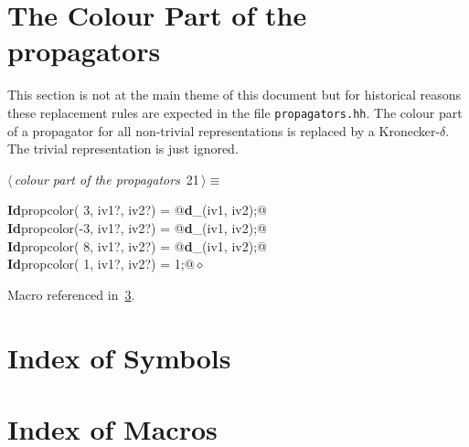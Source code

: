 \documentclass[a4paper,12pt]{amsart}
\renewcommand{\NWtarget}[2]{\hypertarget{#1}{#2}}
\renewcommand{\NWlink}[2]{\hyperlink{#1}{#2}}
\renewcommand{\NWtxtMacroRefIn}{Macro referenced in}
\renewcommand{\NWsep}{${\diamond}$}
\begin{document}
\section{The Colour Part of the propagators}
This section is not at the main theme of this document but for
historical reasons these replacement rules are expected in the
file \texttt{propagators.hh}. The colour part of a propagator
for all non-trivial representations is replaced by a Kronecker-$\delta$.
The trivial representation is just ignored.
\begin{flushleft} \small
\begin{minipage}{\linewidth}\label{scrap46}\raggedright\small
\NWtarget{nuweb21}{} $\langle\,${\itshape colour part of the propagators}\nobreak\ {\footnotesize {21}}$\,\rangle\equiv$
\vspace{-1ex}
\begin{list}{}{} \item
\mbox{}\verb@@\hbox{\sffamily\bfseries Id}\verb@ propcolor( 3, iv1?, iv2?) = @\hbox{\sffamily\bfseries d}\verb@_(iv1, iv2);@\\
\mbox{}\verb@@\hbox{\sffamily\bfseries Id}\verb@ propcolor(-3, iv1?, iv2?) = @\hbox{\sffamily\bfseries d}\verb@_(iv1, iv2);@\\
\mbox{}\verb@@\hbox{\sffamily\bfseries Id}\verb@ propcolor( 8, iv1?, iv2?) = @\hbox{\sffamily\bfseries d}\verb@_(iv1, iv2);@\\
\mbox{}\verb@@\hbox{\sffamily\bfseries Id}\verb@ propcolor( 1, iv1?, iv2?) = 1;@{\NWsep}
\end{list}
\vspace{-1.5ex}
\footnotesize
\begin{list}{}{\setlength{\itemsep}{-\parsep}\setlength{\itemindent}{-\leftmargin}}
\item \NWtxtMacroRefIn\ \NWlink{nuweb3}{3}.

\item{}
\end{list}
\end{minipage}\vspace{4ex}
\end{flushleft}

\appendix

\section{Index of Symbols}


\section{Index of Macros}
\end{document}

